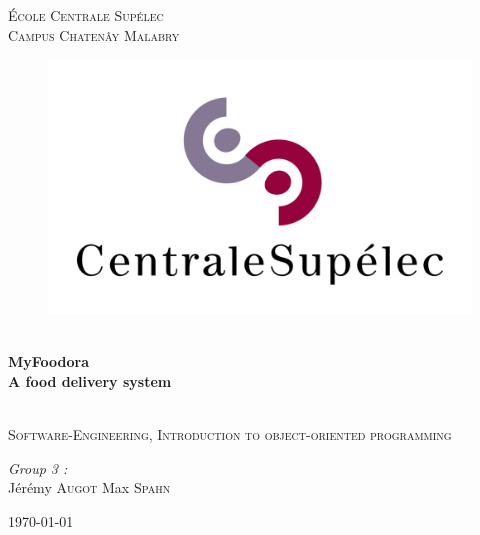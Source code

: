 \begin{titlepage}
\begin{center}



\textsc{\LARGE École Centrale Supélec \\ Campus Chatenây Malabry}\\[1.5cm]


\begin{figure}[H]
	\centering
	\includegraphics[width=0.6\linewidth]{./ima/LogoCS.png}
\end{figure}

\HRule \\[0.4cm]
{ \huge \bfseries MyFoodora \\ A food delivery system \\[0.4cm] }

\HRule \\[1.5cm]

\textsc{\Large Software-Engineering, Introduction to object-oriented programming}\\[0.5cm]

\begin{center} \large
\emph{Group 3 :}\\
Jérémy \textsc{Augot}
Max \textsc{Spahn}
\end{center}

\vfill

{\large \today}

\end{center}
\end{titlepage}
